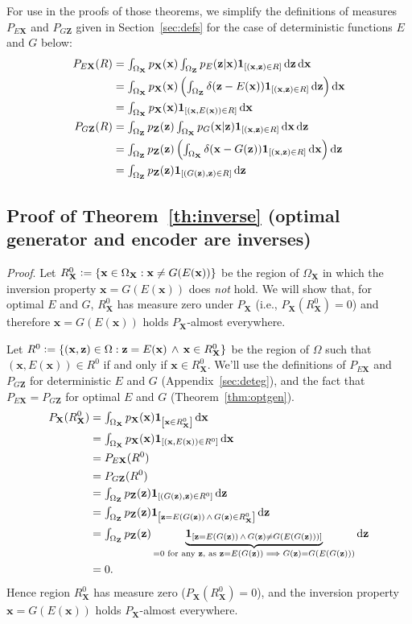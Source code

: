 \documentclass{article}
\newcommand{\proof}{\textit{Proof}.\xspace}
\newcommand{\ldeltafunc}[1]{\mathbf{1}_{\left[#1\right]}}
\newcommand{\defeq}{\vcentcolon=}
\renewcommand{\d}{\mathop{}\!\mathrm{d}}
\def\smallint{\begingroup\textstyle \int\endgroup}
\renewcommand{\vec}[1]{\mathbf{#1}}
\newcommand{\x}{\vec{x}}
\newcommand{\X}{\vec{X}}
\newcommand{\OX}{\Omega_\X}
\newcommand{\z}{\vec{z}}
\newcommand{\Z}{\vec{Z}}
\newcommand{\OZ}{\Omega_\Z}
\begin{document}
\begin{appendices}
For use in the proofs of those theorems, we simplify the definitions of measures $P_{E\X}$ and $P_{G\Z}$ given in Section~\ref{sec:defs} for the case of deterministic functions $E$ and $G$ below:
\begin{align*}
  P_{E\X}(R)
  &= \smallint_{\OX} p_\X(\x) \smallint_{\OZ} p_E(\z | \x) \ldeltafunc{(\x, \z) \in R} \d\z \d\x \\
  &= \smallint_{\OX} p_\X(\x) \left( \smallint_{\OZ} \delta(\z - E(\x)) \ldeltafunc{(\x, \z) \in R} \d\z \right) \d\x \\
  &= \smallint_{\OX} p_\X(\x) \ldeltafunc{(\x, E(\x)) \in R} \d\x \\
  P_{G\Z}(R)
  &= \smallint_{\OZ} p_\Z(\z) \smallint_{\OX} p_G(\x | \z) \ldeltafunc{(\x, \z) \in R} \d\x \d\z \\
  &= \smallint_{\OZ} p_\Z(\z) \left( \smallint_{\OX} \delta(\x - G(\z)) \ldeltafunc{(\x, \z) \in R} \d\x \right) \d\z \\
  &= \smallint_{\OZ} p_\Z(\z) \ldeltafunc{(G(\z), \z) \in R} \d\z
\end{align*}

\subsection{Proof of Theorem~\ref{th:inverse} (optimal generator and encoder are inverses)}
\label{sec:geinv}
\thinv*
\proof
Let $R^0_\X \defeq \{ \x \in \OX : \x \ne G(E(\x)) \}$ be the region of $\OX$ in which the inversion property $\x = G(E(\x))$ does \textit{not} hold.
We will show that, for optimal $E$ and $G$, $R^0_\X$ has measure zero under $P_\X$ (i.e., $P_\X(R^0_\X)=0$) and therefore $\x = G(E(\x))$ holds $P_\X$-almost everywhere.

Let $R^0 \defeq \{ (\x, \z) \in \Omega : \z = E(\x) \,\land\, \x \in R^0_\X \}$ be the region of $\Omega$ such that
$(\x, E(\x)) \in R^0$ if and only if $\x \in R^0_\X$.
We'll use the definitions of $P_{E\X}$ and $P_{G\Z}$ for deterministic $E$ and $G$ (Appendix~\ref{sec:deteg}),
and the fact that $P_{E\X} = P_{G\Z}$ for optimal $E$ and $G$ (Theorem~\ref{thm:optgen}).
\begin{align*}
  P_\X(R^0_\X)
  &= \smallint_{\OX} p_\X(\x) \ldeltafunc{\x \in R^0_\X} \d\x \\
  &= \smallint_{\OX} p_\X(\x) \ldeltafunc{(\x, E(\x)) \in R^0} \d\x \\
  &= P_{E\X}(R^0) \\
  &= P_{G\Z}(R^0) \\
  &= \smallint_{\OZ} p_\Z(\z) \ldeltafunc{(G(\z), \z) \in R^0} \d\z \\
  &= \smallint_{\OZ} p_\Z(\z) \ldeltafunc{\z = E(G(\z)) \,\land\, G(\z) \in R^0_\X} \d\z \\
  &= \smallint_{\OZ} p_\Z(\z) \underbrace{\ldeltafunc{\z = E(G(\z)) \,\land\, G(\z) \ne G(E(G(\z)))}}_{=0\text{ for any }\z\text{, as } \z=E(G(\z)) \implies G(\z) = G(E(G(\z)))} \d\z \\
  &= 0.
\end{align*}
Hence region $R^0_\X$ has measure zero ($P_\X(R^0_\X) = 0$), and the inversion property $\x=G(E(\x))$ holds $P_\X$-almost everywhere.


\end{appendices}
\end{document}
